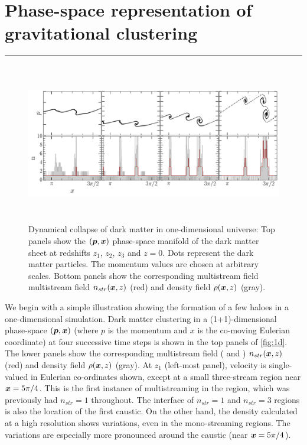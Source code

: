 \documentclass[fleqn,usenatbib,useAMS]{mnras}
\newcommand\hl{\bgroup\markoverwith
  {\textcolor{yellow}{\rule[-.5ex]{2pt}{2.5ex}}}\ULon}
\begin{document}
\section{Phase-space representation of gravitational clustering}
\label{sec:HaloFormation}

\hl{New section}  


\begin{figure} 
\centering\includegraphics[height=7cm]{fig1.pdf} 
\caption{Dynamical collapse of dark matter in one-dimensional universe: Top panels show the $(\bmath{p}, \bmath{x})$ phase-space manifold of the dark matter sheet at redshifts $z_1$, $z_2$, $z_3$ and $z = 0$. Dots represent the dark matter particles. The momentum values are chosen at arbitrary scales. Bottom panels show the corresponding multistream field multistream field $n_{str}(\bmath{x}, z)$ (red) and density field $\rho(\bmath{x}, z)$ (gray). }
\label{fig:1d}
\end{figure}

We begin with a simple illustration showing the formation of a few haloes in a one-dimensional simulation. Dark matter clustering in a (1+1)-dimensional phase-space $(\bmath{p}, \bmath{x})$ (where $p$ is the momentum and $x$ is the co-moving Eulerian coordinate) at four successive time steps is shown in the top panels of \autoref{fig:1d}. The lower panels show the corresponding multistream field (\citealt{Shandarin2012} and \citealt{Abel2012b}) $n_{str}(\bmath{x}, z)$ (red) and density field $\rho(\bmath{x}, z)$ (gray). At $z_1$ (left-most panel), velocity is single-valued in Eulerian co-ordinates shown, except at a small three-stream region near $\bmath{x} = 5\pi/4$. This is the first instance of multistreaming in the region, which was previously had $n_{str} = 1$ throughout. The interface of $n_{str} = 1$ and $n_{str} = 3$ regions is also the location of the first caustic. On the other hand, the density calculated at a high resolution shows variations, even in the mono-streaming regions. The variations are especially more pronounced around  the caustic (near $\bmath{x} = 5\pi/4$).
\end{document}
